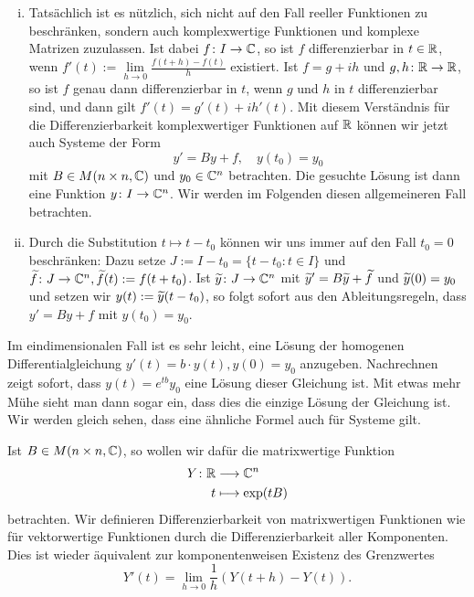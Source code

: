 \begin{bemerkung}
	\label{bem:10.12}
	\begin{enumerate}[(i)]
		\item Tatsächlich ist es nützlich, sich nicht auf den Fall reeller Funktionen zu beschränken, sondern auch komplexwertige Funktionen und komplexe Matrizen zuzulassen.
		Ist dabei $f\colon I \rightarrow \mathbb{C}$, so ist $f$ differenzierbar in $t \in \mathbb{R}$, wenn $f'(t) := \lim\limits_{h \rightarrow 0} \frac{f(t+h) - f(t)}{h}$ existiert.
		Ist $f = g + ih$ und $g,h \colon \mathbb{R} \rightarrow \mathbb{R}$, so ist $f$ genau dann differenzierbar in $t$, wenn $g$ und $h$ in $t$ differenzierbar sind, und dann gilt $f'(t) = g'(t) + ih'(t)$.
		Mit diesem Verständnis für die Differenzierbarkeit komplexwertiger Funktionen auf $\mathbb{R}$ können wir jetzt auch Systeme der Form
		\[
			y' = By +f, \quad y(t_0)=y_0
		\]
		mit $B \in M(n \times n,\mathbb{C})$ und $y_0 \in \mathbb{C}^n$ betrachten.
		Die gesuchte Lösung ist dann eine Funktion $y\colon I \rightarrow \mathbb{C}^n$.
		Wir werden im Folgenden diesen allgemeineren Fall betrachten.
		\item Durch die Substitution $t \mapsto t-t_0$ können wir uns immer auf den Fall $t_0 = 0$ beschränken:
		Dazu setze $J := I-t_0 = \{t-t_0 : t \in I\}$ und $\widetilde{f} \colon J \rightarrow \mathbb{C}^n, \widetilde{f}(t) := f(t+t_0)$.
		Ist $\widetilde{y} \colon J \rightarrow \mathbb{C}^n$ mit $\widetilde{y}' = B \widetilde{y} + \widetilde{f}$ und $\widetilde{y}(0) = y_0$ und setzen wir $y(t) := \widetilde{y}(t-t_0)$, so folgt sofort aus den Ableitungsregeln, dass $y' = By + f$ mit $y(t_0) = y_0$.
	\end{enumerate}
\end{bemerkung}

Im eindimensionalen Fall ist es sehr leicht, eine Lösung der homogenen Differentialgleichung $y'(t) = b \cdot y(t), y(0) = y_0$ anzugeben.
Nachrechnen zeigt sofort, dass $y(t) = e^{tb} y_0$ eine Lösung dieser Gleichung ist.
Mit etwas mehr Mühe sieht man dann sogar ein, dass dies die einzige Lösung der Gleichung ist.
Wir werden gleich sehen, dass eine ähnliche Formel auch für Systeme gilt.

Ist $B \in M(n \times n,\mathbb{C})$, so wollen wir dafür die matrixwertige Funktion
\begin{align*}
	Y\colon \mathbb{R} &\longrightarrow \mathbb{C}^{n} \\
	t &\longmapsto \exp(tB)
\end{align*}
betrachten.
Wir definieren Differenzierbarkeit von matrixwertigen Funktionen wie für vektorwertige Funktionen durch die Differenzierbarkeit aller Komponenten.
Dies ist wieder äquivalent zur komponentenweisen Existenz des Grenzwertes
\[
	Y'(t) = \lim\limits_{h \rightarrow 0} \frac{1}{h}(Y(t+h)-Y(t)).
\]

